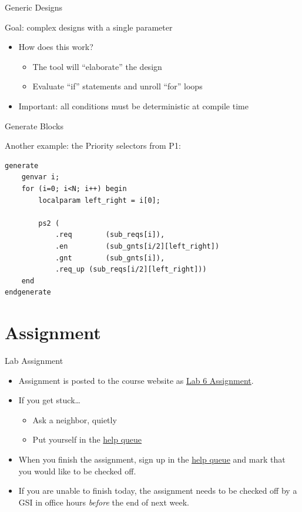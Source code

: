\documentclass[table,dvipsnames]{beamer}
\begin{document}
 
     \begin{frame}[fragile]{Generic Designs}
	\begin{block}{Goal: complex designs with a single parameter}
		\begin{itemize}
			\item How does this work?
			\begin{itemize}
				\item The tool will ``elaborate'' the design
				\item Evaluate ``if'' statements and unroll ``for'' loops
			\end{itemize}
			\item Important: all conditions must be deterministic at compile time
		\end{itemize}
	\end{block}
\end{frame}
 
\begin{frame}[fragile]{Generate Blocks}
	\begin{block}{Another example: the Priority selectors from P1:}
		 \begin{verbatim}
generate
	genvar i;
	for (i=0; i<N; i++) begin
		localparam left_right = i[0];
		
		ps2 (
			.req		(sub_reqs[i]),
			.en 		(sub_gnts[i/2][left_right])
			.gnt		(sub_gnts[i]),
			.req_up	(sub_reqs[i/2][left_right]))
	end
endgenerate
			\end{verbatim}
	\end{block}
\end{frame}
 
 
 


 
 
 

\section{Assignment}
\begin{frame}[fragile]{Lab Assignment}
	\begin{itemize}
		\item Assignment is posted to the course website as 
			\href{http://www.eecs.umich.edu/courses/eecs470/labs/eecs470lab6assignment.pdf}{Lab
			6 Assignment}.
		\item If you get stuck\dots
			\begin{itemize}
				\item Ask a neighbor, quietly
				\item Put yourself in the 
					\href{https://oh.eecs.umich.edu/courses/eecs470}{help queue}
			\end{itemize}
		\item When you finish the assignment, sign up in the
			\href{https://oh.eecs.umich.edu/courses/eecs470}{help queue}
			and mark that you would like to be checked off.
		\item If you are unable to finish today, the assignment needs to be
			checked off by a GSI in office hours \emph{before} the end of next week.
	\end{itemize}
\end{frame}
\end{document}
